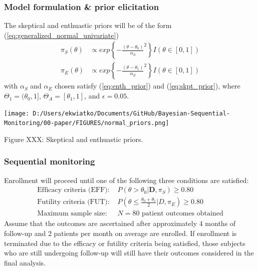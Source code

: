 \documentclass[12pt]{article}
\begin{document}
\subsubsection{Model formulation \& prior elicitation}
The skeptical and enthuastic priors will be of the form (\ref{eq:generalized_normal_univariate})
\begin{align*}
\pi_S(\theta)&\propto exp\left\{-\frac{(\theta-\theta_0)}{\alpha_S}^2\right\} I(\theta\in[0,1])\\
\pi_E(\theta)&\propto exp\left\{-\frac{(\theta-\theta_1)}{\alpha_E}^2\right\} I(\theta\in[0,1])
\end{align*}
with $\alpha_S$ and $\alpha_E$ chosen satisfy (\ref{eq:enth_prior}) and (\ref{eq:skpt_prior}), where $\Theta_1=(\theta_0,1]$, $\Theta_A=[\theta_1,1]$, and $\epsilon=0.05$.
\begin{center}
\texttt{[image: D:/Users/ekwiatko/Documents/GitHub/Bayesian-Sequential-Monitoring/00-paper/FIGURES/normal\_priors.png]}

Figure XXX: Skeptical and enthuastic priors.
\end{center}



\subsubsection{Sequential monitoring}
Enrollment will proceed until one of the following three conditions are satisfied:
\begin{align*}
\text{Efficacy criteria (EFF): }&P(\theta>\theta_0|\mathbf{D},\pi_S)\geq 0.80\\
\text{Futility criteria (FUT): }&P(\theta\leq\frac{\theta_0+\theta_1}{2}|D,\pi_E)\geq 0.80\\
\text{Maximum sample size: }&N=80 \text{ patient outcomes obtained}
\end{align*}
Assume that the outcomes are ascertained after approximately 4 months of follow-up and 2 patients per month on average are enrolled. If enrollment is terminated due to the efficacy or futility criteria being satisfied, those subjects who are still undergoing follow-up will still have their outcomes considered in the final analysis.
\end{document}

